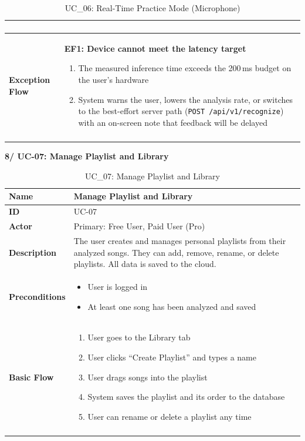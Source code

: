 \documentclass[a4paper]{article}
\newlength{\ucLeft}
\begin{document}
\begin{longtable}{|>{\bfseries}p{\ucLeft}|p{\dimexpr\linewidth-\ucLeft-2\tabcolsep-2\arrayrulewidth}|}
\begin{enumerate}[leftmargin=1.5em, nosep, topsep=2pt, partopsep=0pt, parsep=0pt, after=\strut]
\end{enumerate}
\\ \hline
Exception Flow &
\textbf{EF1: Device cannot meet the latency target}
\begin{enumerate}[leftmargin=1.5em, nosep, topsep=2pt, partopsep=0pt, parsep=0pt, after=\strut]
    \item The measured inference time exceeds the 200\,ms budget on the user's hardware
    \item System warns the user, lowers the analysis rate, or switches to the best-effort server path (\texttt{POST /api/v1/recognize}) with an on-screen note that feedback will be delayed
\end{enumerate}
\\ \hline
\caption{UC\_06: Real-Time Practice Mode (Microphone)}\label{tab:uc06}
\end{longtable}

\vspace{0.5em}
\noindent\textbf{8/ UC-07: Manage Playlist and Library}

\begin{longtable}{|>{\bfseries}p{\ucLeft}|p{\dimexpr\linewidth-\ucLeft-2\tabcolsep-2\arrayrulewidth}|}
\hline
Name & Manage Playlist and Library \\ \hline
ID & UC-07 \\ \hline
Actor & Primary: Free User, Paid User (Pro) \\ \hline
Description & The user creates and manages personal playlists from their analyzed songs. They can add, remove, rename, or delete playlists. All data is saved to the cloud. \\ \hline
Preconditions &
\begin{itemize}[leftmargin=1em, nosep, topsep=2pt, partopsep=0pt, parsep=0pt, after=\strut]
    \item User is logged in
    \item At least one song has been analyzed and saved
\end{itemize}
\\ \hline
Basic Flow &
\begin{enumerate}[leftmargin=1.5em, nosep, topsep=2pt, partopsep=0pt, parsep=0pt, after=\strut]
    \item User goes to the Library tab
    \item User clicks ``Create Playlist'' and types a name
    \item User drags songs into the playlist
    \item System saves the playlist and its order to the database
    \item User can rename or delete a playlist any time
\end{enumerate}
\\ \hline
\caption{UC\_07: Manage Playlist and Library}\label{tab:uc07}
\end{longtable}
\end{document}
